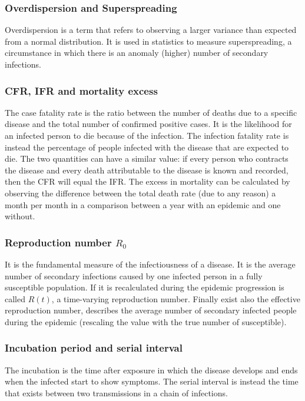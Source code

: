 \subsubsection{Overdispersion and Superspreading} Overdispersion is a term that refers to observing a larger variance than expected from a normal distribution. It is used in statistics to measure superspreading, a circumstance in which there is an anomaly (higher) number of secondary infections.

\subsubsection{CFR, IFR and mortality excess} The case fatality rate is the ratio between the number of deaths due to a specific disease and the total number of confirmed positive cases. It is the likelihood for an infected person to die because of the infection. The infection fatality rate is instead the percentage of people infected with the disease that are expected to die. The two quantities can have a similar value: if every person who contracts the disease and every death attributable to the disease is known and recorded, then the CFR will equal the IFR.
The excess in mortality can be calculated by observing the difference between the total death rate (due to any reason) a month per month in a comparison between a year with an epidemic and one without. 

\subsubsection{Reproduction number $R_0$} It is the fundamental measure of the infectiousness of a disease. It is the average number of secondary infections caused by one infected person in a fully susceptible population. If it is recalculated during the epidemic progression is called $R(t)$, a time-varying reproduction number. Finally exist also the effective reproduction number, describes the average number of secondary infected people during the epidemic (rescaling the value with the true number of susceptible). 


\subsubsection{Incubation period and serial interval} The incubation is the time after exposure in which the disease develops and ends when the infected start to show symptoms. The serial interval is instead the time that exists between two transmissions in a chain of infections. 

